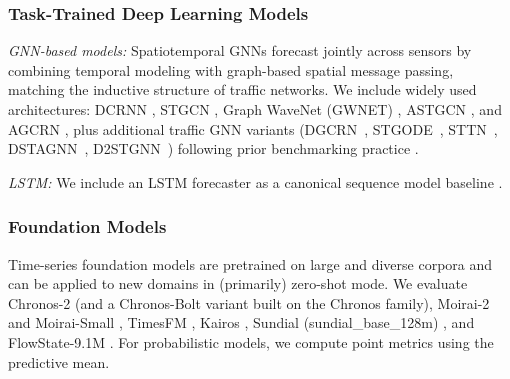 \documentclass[10pt]{article}
\begin{document}
\subsubsection{Task-Trained Deep Learning  Models}


\textit{GNN-based models:}
Spatiotemporal GNNs forecast jointly across sensors by combining temporal modeling with graph-based spatial
message passing, matching the inductive structure of traffic networks. We include widely used architectures:
DCRNN \citep{li2018dcrnn}, STGCN \citep{yu2018stgcn}, Graph WaveNet (GWNET) \citep{wu2019graphwavenet},
ASTGCN \citep{guo2019attention}, and AGCRN \citep{bai2020adaptive}, plus additional traffic GNN variants
(DGCRN~\citep{li2021dynamic}, STGODE~\citep{fang2021spatial}, STTN~\citep{xu2020spatial}, DSTAGNN~\citep{lan2022dstagnn}, D2STGNN~\citep{shao2022decoupled}) following prior benchmarking practice \citep{liu2023needgnn, lan2022dstagnn}.

\textit{LSTM:}
We include an LSTM forecaster as a canonical sequence model baseline \citep{hochreiter1997lstm}.

\subsubsection{Foundation Models}
Time-series foundation models are pretrained on large and diverse corpora and can be applied to new domains
in (primarily) zero-shot mode. We evaluate Chronos-2 \citep{ansari2024chronos} (and a Chronos-Bolt variant built
on the Chronos family), Moirai-2 and Moirai-Small \citep{woo2024moirai},
TimesFM \citep{das2024timesfm}, Kairos \citep{feng2025kairos}, Sundial (sundial\_base\_128m) \citep{liu2025sundial},
and FlowState-9.1M \citep{graf2025flowstate}. For probabilistic models, we compute point metrics using the predictive mean.




\end{document}
